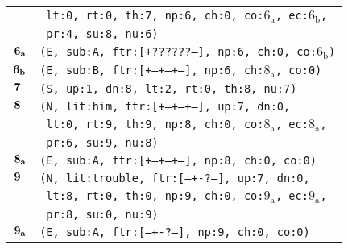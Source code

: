 \documentclass{article}
\begin{document}
\begin{minipage}{\textwidth}
{\begin{tabular}{|r|l|}
    & \texttt{\texttt{~lt:0,~rt:0,~th:7,~np:6,~ch:0,~co:${\textrm{6}_{\textrm{a}}}$,~ec:${\textrm{6}_{\textrm{b}}}$,}} \\
    & \texttt{\texttt{~pr:4,~su:8,~nu:6)}} \\
    ${\textbf{\textrm{6}}_{\textbf{\textrm{a}}}}$ & \texttt{\texttt{(E,~sub:A,~ftr:[+??????--],~np:6,~ch:0,~co:${\textrm{6}_{\textrm{b}}}$)}} \\
    ${\textbf{\textrm{6}}_{\textbf{\textrm{b}}}}$ & \texttt{\texttt{(E,~sub:B,~ftr:[+--+--+--],~np:6,~ch:${\textrm{8}_{\textrm{a}}}$,~co:0)}} \\
    ${\textbf{\textrm{7}}_{\phantom{z}}}$ & \texttt{\texttt{(S,~up:1,~dn:8,~lt:2,~rt:0,~th:8,~nu:7)}} \\
    ${\textbf{\textrm{8}}_{\phantom{z}}}$ & \texttt{\texttt{(N,~lit:him,~ftr:[+--+--+--],~up:7,~dn:0,}} \\
    & \texttt{\texttt{~lt:0,~rt:9,~th:9,~np:8,~ch:0,~co:${\textrm{8}_{\textrm{a}}}$,~ec:${\textrm{8}_{\textrm{a}}}$,}} \\
    & \texttt{\texttt{~pr:6,~su:9,~nu:8)}} \\
    ${\textbf{\textrm{8}}_{\textbf{\textrm{a}}}}$ & \texttt{\texttt{(E,~sub:A,~ftr:[+--+--+--],~np:8,~ch:0,~co:0)}} \\
    ${\textbf{\textrm{9}}_{\phantom{z}}}$ & \texttt{\texttt{(N,~lit:trouble,~ftr:[---+-?---],~up:7,~dn:0,}} \\
    & \texttt{\texttt{~lt:8,~rt:0,~th:0,~np:9,~ch:0,~co:${\textrm{9}_{\textrm{a}}}$,~ec:${\textrm{9}_{\textrm{a}}}$,}} \\
    & \texttt{\texttt{~pr:8,~su:0,~nu:9)}} \\
    ${\textbf{\textrm{9}}_{\textbf{\textrm{a}}}}$ & \texttt{\texttt{(E,~sub:A,~ftr:[---+-?---],~np:9,~ch:0,~co:0)}} \\
    \hline
  \end{tabular}
  }
\end{minipage}
\bigbreak
\end{document}
